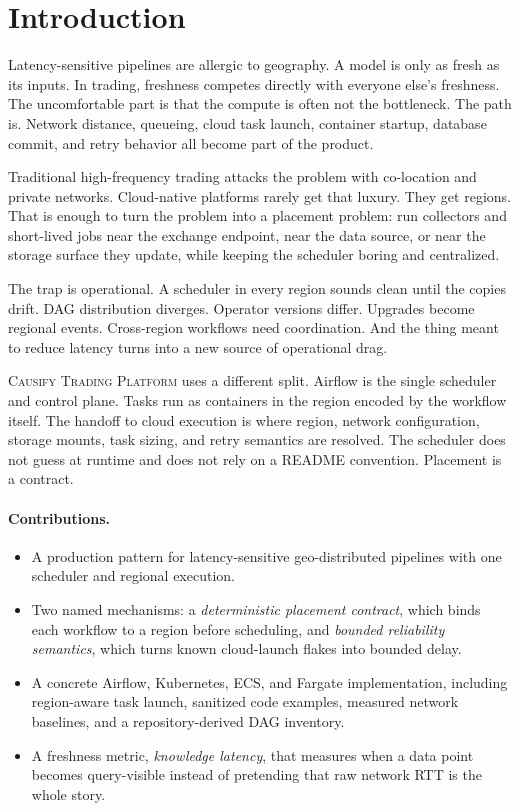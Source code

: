 \documentclass[11pt, reqno]{amsart}
\newcommand{\system}{\textsc{Causify Trading Platform}}
\newcommand{\dpc}{\emph{deterministic placement contract}}
\newcommand{\brs}{\emph{bounded reliability semantics}}
\newcommand{\kmetric}{\emph{knowledge latency}}
\begin{document}
\setcounter{tocdepth}{1}
\tableofcontents

\section{Introduction}
\label{sec:introduction}

Latency-sensitive pipelines are allergic to geography. A model is only as fresh as its inputs. In trading, freshness competes directly with everyone else's freshness. The uncomfortable part is that the compute is often not the bottleneck. The path is. Network distance, queueing, cloud task launch, container startup, database commit, and retry behavior all become part of the product.

Traditional high-frequency trading attacks the problem with co-location and private networks. Cloud-native platforms rarely get that luxury. They get regions. That is enough to turn the problem into a placement problem: run collectors and short-lived jobs near the exchange endpoint, near the data source, or near the storage surface they update, while keeping the scheduler boring and centralized.

The trap is operational. A scheduler in every region sounds clean until the copies drift. DAG distribution diverges. Operator versions differ. Upgrades become regional events. Cross-region workflows need coordination. And the thing meant to reduce latency turns into a new source of operational drag.

\system{} uses a different split. Airflow is the single scheduler and control plane. Tasks run as containers in the region encoded by the workflow itself. The handoff to cloud execution is where region, network configuration, storage mounts, task sizing, and retry semantics are resolved. The scheduler does not guess at runtime and does not rely on a README convention. Placement is a contract.

\paragraph{Contributions.}
\begin{itemize}
  \item A production pattern for latency-sensitive geo-distributed pipelines with one scheduler and regional execution.
  \item Two named mechanisms: a \dpc{}, which binds each workflow to a region before scheduling, and \brs{}, which turns known cloud-launch flakes into bounded delay.
  \item A concrete Airflow, Kubernetes, ECS, and Fargate implementation, including region-aware task launch, sanitized code examples, measured network baselines, and a repository-derived DAG inventory.
  \item A freshness metric, \kmetric{}, that measures when a data point becomes query-visible instead of pretending that raw network RTT is the whole story.
\end{itemize}
\end{document}
